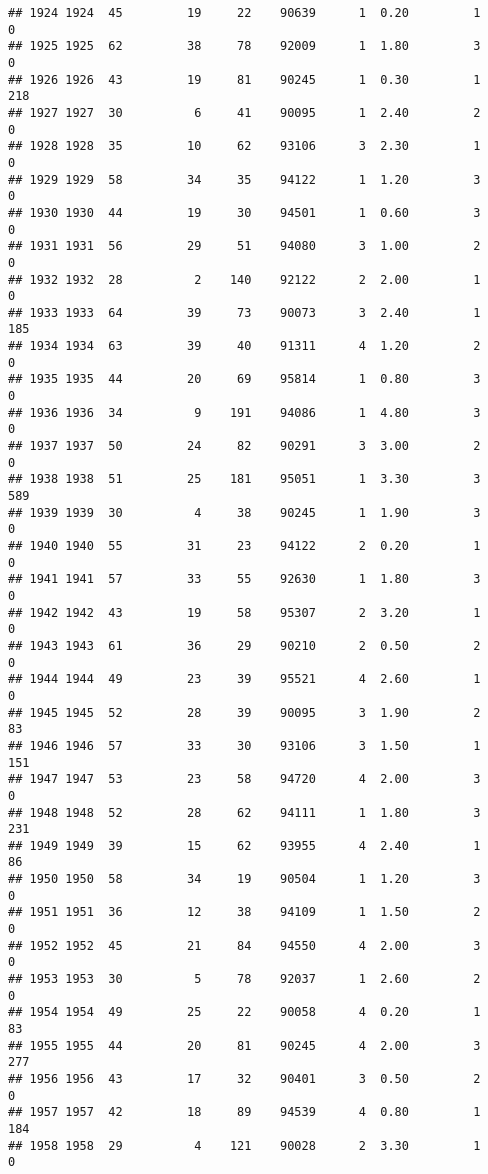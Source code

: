 \documentclass[
]{article}
\begin{document}
\begin{verbatim}
## 1924 1924  45         19     22    90639      1  0.20         1        0
## 1925 1925  62         38     78    92009      1  1.80         3        0
## 1926 1926  43         19     81    90245      1  0.30         1      218
## 1927 1927  30          6     41    90095      1  2.40         2        0
## 1928 1928  35         10     62    93106      3  2.30         1        0
## 1929 1929  58         34     35    94122      1  1.20         3        0
## 1930 1930  44         19     30    94501      1  0.60         3        0
## 1931 1931  56         29     51    94080      3  1.00         2        0
## 1932 1932  28          2    140    92122      2  2.00         1        0
## 1933 1933  64         39     73    90073      3  2.40         1      185
## 1934 1934  63         39     40    91311      4  1.20         2        0
## 1935 1935  44         20     69    95814      1  0.80         3        0
## 1936 1936  34          9    191    94086      1  4.80         3        0
## 1937 1937  50         24     82    90291      3  3.00         2        0
## 1938 1938  51         25    181    95051      1  3.30         3      589
## 1939 1939  30          4     38    90245      1  1.90         3        0
## 1940 1940  55         31     23    94122      2  0.20         1        0
## 1941 1941  57         33     55    92630      1  1.80         3        0
## 1942 1942  43         19     58    95307      2  3.20         1        0
## 1943 1943  61         36     29    90210      2  0.50         2        0
## 1944 1944  49         23     39    95521      4  2.60         1        0
## 1945 1945  52         28     39    90095      3  1.90         2       83
## 1946 1946  57         33     30    93106      3  1.50         1      151
## 1947 1947  53         23     58    94720      4  2.00         3        0
## 1948 1948  52         28     62    94111      1  1.80         3      231
## 1949 1949  39         15     62    93955      4  2.40         1       86
## 1950 1950  58         34     19    90504      1  1.20         3        0
## 1951 1951  36         12     38    94109      1  1.50         2        0
## 1952 1952  45         21     84    94550      4  2.00         3        0
## 1953 1953  30          5     78    92037      1  2.60         2        0
## 1954 1954  49         25     22    90058      4  0.20         1       83
## 1955 1955  44         20     81    90245      4  2.00         3      277
## 1956 1956  43         17     32    90401      3  0.50         2        0
## 1957 1957  42         18     89    94539      4  0.80         1      184
## 1958 1958  29          4    121    90028      2  3.30         1        0

\end{verbatim}
\end{document}
